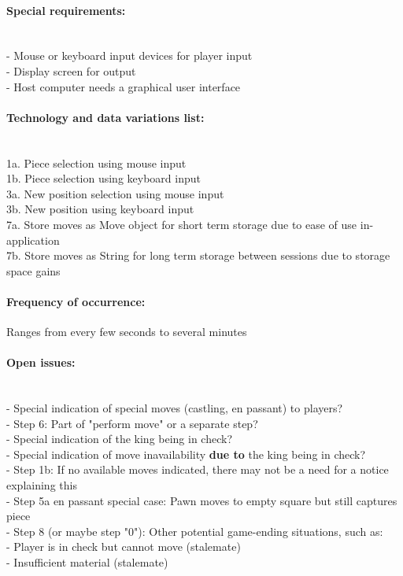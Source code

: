 \documentclass{article}
\begin{document}
\paragraph{Special requirements:}\mbox{}\\
- Mouse or keyboard input devices for player input\\
- Display screen for output\\
- Host computer needs a graphical user interface

\paragraph{Technology and data variations list:}\mbox{}\\
1a. Piece selection using mouse input\\
1b. Piece selection using keyboard input\\
3a. New position selection using mouse input\\
3b. New position using keyboard input\\
7a. Store moves as Move object for short term storage due to ease of use in-application\\
7b. Store moves as String for long term storage between sessions due to storage space gains

\paragraph{Frequency of occurrence:} Ranges from every few seconds to several minutes

\paragraph{Open issues:}\mbox{}\\
- Special indication of special moves (castling, en passant) to players?\\
- Step 6: Part of "perform move" or a separate step?\\
- Special indication of the king being in check?\\
- Special indication of move inavailability \textbf{due to} the king being in check?\\
- Step 1b: If no available moves indicated, there may not be a need for a notice explaining this\\
- Step 5a en passant special case: Pawn moves to empty square but still captures piece\\
- Step 8 (or maybe step "0"): Other potential game-ending situations, such as:\\
\indent- Player is in check but cannot move (stalemate)\\
\indent- Insufficient material (stalemate)
\newpage
\end{document}
